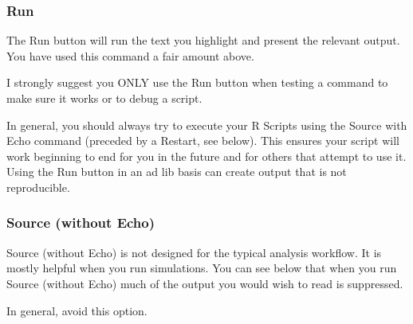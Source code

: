 \documentclass[
]{krantz}
\makeatletter
\newenvironment{Shaded}{\begin{snugshade}}{\end{snugshade}}
\newcommand{\DataTypeTok}[1]{\textcolor[rgb]{0.27,0.27,0.27}{#1}}
\newcommand{\DecValTok}[1]{\textcolor[rgb]{0.06,0.06,0.06}{#1}}
\newcommand{\KeywordTok}[1]{\textcolor[rgb]{0.27,0.27,0.27}{\textbf{#1}}}
\newcommand{\NormalTok}[1]{#1}
\newcommand{\OperatorTok}[1]{\textcolor[rgb]{0.43,0.43,0.43}{\textbf{#1}}}
\newcommand{\StringTok}[1]{\textcolor[rgb]{0.5,0.5,0.5}{#1}}
\newenvironment{kframe}{%
\medskip{}
\setlength{\fboxsep}{.8em}
 \def\at@end@of@kframe{}%
 \ifinner\ifhmode%
  \def\at@end@of@kframe{\end{minipage}}%
  \begin{minipage}{\columnwidth}%
 \fi\fi%
 \def\FrameCommand##1{\hskip\@totalleftmargin \hskip-\fboxsep
 \colorbox{shadecolor}{##1}\hskip-\fboxsep
     \hskip-\linewidth \hskip-\@totalleftmargin \hskip\columnwidth}%
 \MakeFramed {\advance\hsize-\width
   \@totalleftmargin\z@ \linewidth\hsize
   \@setminipage}}%
 {\par\unskip\endMakeFramed%
 \at@end@of@kframe}
\renewenvironment{Shaded}{\begin{kframe}}{\end{kframe}}
\makeatother
\begin{document}
\hypertarget{run}{%
\subsubsection{Run}\label{run}}

The Run button will run the text you highlight and present the relevant output. You have used this command a fair amount above.

I strongly suggest you ONLY use the Run button when testing a command to make sure it works or to debug a script.

In general, you should always try to execute your R Scripts using the Source with Echo command (preceded by a Restart, see below). This ensures your script will work beginning to end for you in the future and for others that attempt to use it. Using the Run button in an ad lib basis can create output that is not reproducible.

\hypertarget{source-without-echo}{%
\subsubsection{Source (without Echo)}\label{source-without-echo}}

Source (without Echo) is not designed for the typical analysis workflow. It is mostly helpful when you run simulations. You can see below that when you run Source (without Echo) much of the output you would wish to read is suppressed.

In general, avoid this option.

\begin{Shaded}
\end{Shaded}
\end{document}
